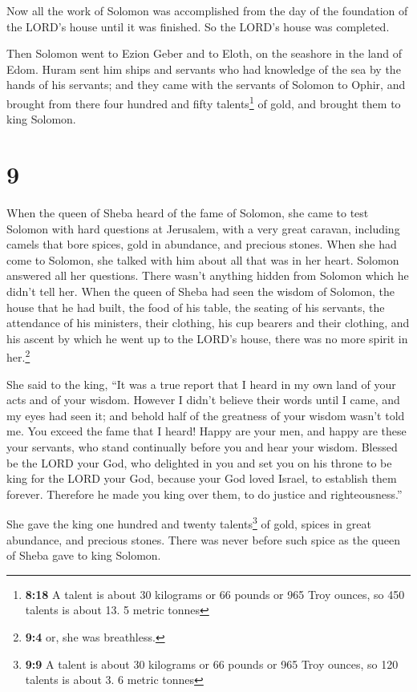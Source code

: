  Now all the work of Solomon was accomplished from the
day of the foundation of the LORD's house until it was finished. So the
LORD's house was completed.

 Then Solomon went to Ezion Geber and to Eloth, on the
seashore in the land of Edom.  Huram sent him ships and
servants who had knowledge of the sea by the hands of his servants; and
they came with the servants of Solomon to Ophir, and brought from there
four hundred and fifty talents\footnote{\textbf{8:18} A talent is about
  30 kilograms or 66 pounds or 965 Troy ounces, so 450 talents is about
  13. 5 metric tonnes} of gold, and brought them to king Solomon.

\hypertarget{section-8}{%
\section{9}\label{section-8}}

 When the queen of Sheba heard of the fame of Solomon, she
came to test Solomon with hard questions at Jerusalem, with a very great
caravan, including camels that bore spices, gold in abundance, and
precious stones. When she had come to Solomon, she talked with him about
all that was in her heart.  Solomon answered all her
questions. There wasn't anything hidden from Solomon which he didn't
tell her.  When the queen of Sheba had seen the wisdom of
Solomon, the house that he had built,  the food of his
table, the seating of his servants, the attendance of his ministers,
their clothing, his cup bearers and their clothing, and his ascent by
which he went up to the LORD's house, there was no more spirit in
her.\footnote{\textbf{9:4} or, she was breathless.}

 She said to the king, ``It was a true report that I heard
in my own land of your acts and of your wisdom.  However I
didn't believe their words until I came, and my eyes had seen it; and
behold half of the greatness of your wisdom wasn't told me. You exceed
the fame that I heard!  Happy are your men, and happy are
these your servants, who stand continually before you and hear your
wisdom.  Blessed be the LORD your God, who delighted in
you and set you on his throne to be king for the LORD your God, because
your God loved Israel, to establish them forever. Therefore he made you
king over them, to do justice and righteousness.''

 She gave the king one hundred and twenty
talents\footnote{\textbf{9:9} A talent is about 30 kilograms or 66
  pounds or 965 Troy ounces, so 120 talents is about 3. 6 metric tonnes}
of gold, spices in great abundance, and precious stones. There was never
before such spice as the queen of Sheba gave to king Solomon.

